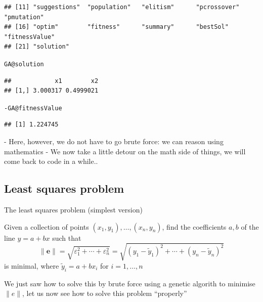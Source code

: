 \documentclass[aspectratio=169]{beamer}\usepackage[]{graphicx}\usepackage[]{xcolor}
\makeatletter
\newcommand{\hlopt}[1]{\textcolor[rgb]{0,0,0}{#1}}%
\newcommand{\hlstd}[1]{\textcolor[rgb]{0.345,0.345,0.345}{#1}}%
\newcommand{\hlkwc}[1]{\textcolor[rgb]{0.333,0.667,0.333}{#1}}%
\newenvironment{kframe}{%
 \def\at@end@of@kframe{}%
 \ifinner\ifhmode%
  \def\at@end@of@kframe{\end{minipage}}%
  \begin{minipage}{\columnwidth}%
 \fi\fi%
 \def\FrameCommand##1{\hskip\@totalleftmargin \hskip-\fboxsep
 \colorbox{shadecolor}{##1}\hskip-\fboxsep
     \hskip-\linewidth \hskip-\@totalleftmargin \hskip\columnwidth}%
 \MakeFramed {\advance\hsize-\width
   \@totalleftmargin\z@ \linewidth\hsize
   \@setminipage}}%
 {\par\unskip\endMakeFramed%
 \at@end@of@kframe}
\newenvironment{knitrout}{}{} %
\makeatother
\begin{document}
\begin{frame}[fragile]
\begin{knitrout}
\begin{kframe}
\begin{verbatim}
## [11] "suggestions"  "population"   "elitism"      "pcrossover"   "pmutation"   
## [16] "optim"        "fitness"      "summary"      "bestSol"      "fitnessValue"
## [21] "solution"
\end{verbatim}
\begin{alltt}
\hlstd{GA}\hlopt{@}\hlkwc{solution}
\end{alltt}
\begin{verbatim}
##            x1        x2
## [1,] 3.000317 0.4999021
\end{verbatim}
\begin{alltt}
\hlopt{-}\hlstd{GA}\hlopt{@}\hlkwc{fitnessValue}
\end{alltt}
\begin{verbatim}
## [1] 1.224745
\end{verbatim}
\end{kframe}
\end{knitrout}

- Here, however, we do not have to go brute force: we can reason using mathematics
- We now take a little detour on the math side of things, we will come back to code in a while..
\end{frame}



\subsection{Least squares problem}

\begin{frame}{The least squares problem (simplest version)}
	\begin{definition}
		Given a collection of points $(x_1,y_1),\ldots,(x_n,y_n)$, find the coefficients $a,b$ of the line $y=a+bx$ such that
		$$
		\|\mathbf{e}\|=\sqrt{\varepsilon_1^2+\cdots+\varepsilon_n^2}
		=\sqrt{(y_1-\tilde y_1)^2+\cdots+(y_n-\tilde y_n)^2}
		$$
		is minimal, where $\tilde y_i=a+bx_i$ for $i=1,\ldots,n$
	\end{definition}
	\vfill
	We just saw how to solve this by brute force using a genetic algorith to minimise $\|e\|$, let us now see how to solve this problem ``properly''
\end{frame}
\end{document}
